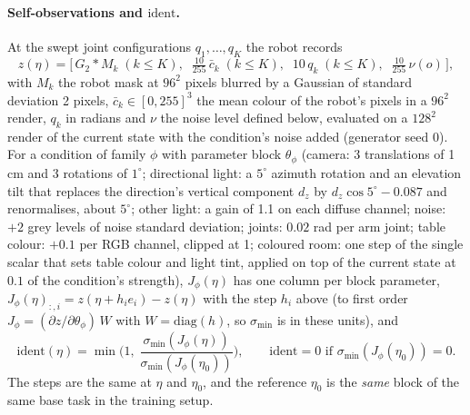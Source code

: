 \documentclass{article}
\newcommand{\ident}{\mathrm{ident}}
\begin{document}
\paragraph{Self-observations and $\ident$.} At the swept joint configurations $q_1, \dots, q_K$ the robot records
\begin{equation}
z(\eta) = \Big[\, G_{2} * M_k \;(k \le K),\;\; \tfrac{10}{255}\,\bar c_k \;(k \le K),\;\; 10\, q_k \;(k\le K),\;\;
\tfrac{10}{255}\,\nu(o) \,\Big],
\end{equation}
with $M_k$ the robot mask at $96^2$ pixels blurred by a Gaussian of standard deviation 2 pixels, $\bar c_k \in
[0,255]^3$ the mean colour of the robot's pixels in a $96^2$ render, $q_k$ in radians and $\nu$ the noise level
defined below, evaluated on a $128^2$ render of the current state with the condition's noise added (generator seed 0). For a
condition of family $\phi$ with parameter block $\theta_\phi$ (camera: 3 translations of 1 cm and 3 rotations of
$1^\circ$; directional light: a $5^\circ$ azimuth rotation and an elevation tilt that replaces the direction's
vertical component $d_z$ by $d_z\cos 5^\circ - 0.087$ and renormalises, about $5^\circ$; other light: a gain of 1.1 on
each diffuse channel; noise: $+2$ grey levels of noise standard deviation; joints: $0.02$ rad per arm joint; table
colour: $+0.1$ per RGB channel, clipped at 1; coloured room: one step of the single scalar that sets table colour
and light tint, applied on top of the current state at $0.1$ of the condition's strength), $J_\phi(\eta)$ has one column per block
parameter, $J_\phi(\eta)_{:,i} = z(\eta + h_i e_i) - z(\eta)$ with the step $h_i$ above (to first order
$J_\phi = (\partial z/\partial\theta_\phi)\,W$ with $W = \mathrm{diag}(h)$, so $\sigma_{\min}$ is in these units), and
\begin{equation}
\ident(\eta) = \min\!\Big(1,\; \frac{\sigma_{\min}(J_\phi(\eta))}{\sigma_{\min}(J_\phi(\eta_0))}\Big),
\qquad \ident = 0 \text{ if } \sigma_{\min}(J_\phi(\eta_0)) = 0 .
\label{eq:ident}
\end{equation}
The steps are the same at $\eta$ and $\eta_0$, and the reference $\eta_0$ is the \emph{same} block of the same base
task in the training setup.
\end{document}
